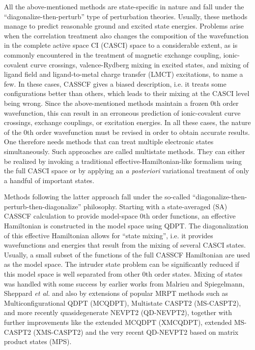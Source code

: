 All the above-mentioned methods are state-specific in nature and fall under the ``di\-ag\-o\-nal\-ize-then-perturb''\cite{Shavi_2002_639} type of perturbation theories. Usually, these methods manage to predict reasonable ground and excited state energies. Problems arise when the correlation treatment also changes the composition of the wavefunction in the complete active space CI (CASCI) space to a considerable extent,\cite{Shavi_2002_639} as is commonly encountered in the treatment of magnetic exchange coupling, ionic-covalent curve crossings, valence-Rydberg mixing in excited states, and mixing of ligand field and ligand-to-metal charge transfer (LMCT) excitations, to name a few. In these cases, CASSCF gives a biased description, i.e. it treats some configurations better than others, which leads to their mixing at the CASCI level being wrong.
Since the above-mentioned methods maintain a frozen 0th order wavefunction, this can result in an erroneous prediction of ionic-covalent curve crossings,\cite{MalriHZ_1995_167} exchange couplings, or excitation energies. In all these cases, the nature of the 0th order wavefunction must be revised in order to obtain accurate results. One therefore needs methods that can treat multiple electronic states simultaneously. Such approaches are called multistate methods. They can either be realized by invoking a traditional effective-Hamiltonian-like formalism using the full CASCI space or by applying an \textit{a posteriori} variational treatment of only a handful of important states.

Methods following the latter approach fall under the so-called ``diagonalize-then-per\-turb-then-diagonalize''\cite{Shavi_2002_639} philosophy. Starting with a state-averaged (SA) CASSCF calculation to provide model-space 0th order functions, an effective Hamiltonian is constructed in the model space using QDPT. The diagonalization of this effective Hamiltonian allows for ``state mixing'', i.e. it provides wavefunctions and energies that result from the mixing of several CASCI states. Usually, a small subset of the functions of the full CASSCF Hamiltonian are used as the model space. The intruder state problem can be significantly reduced if this model space is well separated from other 0th order states. Mixing of states was handled with some success by earlier works from Malrieu and Spiegelmann,\cite{SpiegM_1984_1235} Sheppard \textit{et al.}\cite{SheppSM_1983_1364} and also by extensions of popular MRPT methods such as Multiconfigurational QDPT (MCQDPT),\cite{Nakan_1993_7983} Multistate CASPT2 (MS-CASPT2),\cite{FinleMRS_1998_299} and more recently quasidegenerate NEVPT2 (QD-NEVPT2),\cite{AngelCM_2006_434} together with further improvements like the extended MCQDPT (XMCQDPT),\cite{Grano_2011_214113} extended MS-CASPT2 (XMS-CASPT2)\cite{ShiozGCW_2011_81106} and the very recent QD-NEVPT2 based on matrix product states (MPS).\cite{SharmJA_2016_34103}

